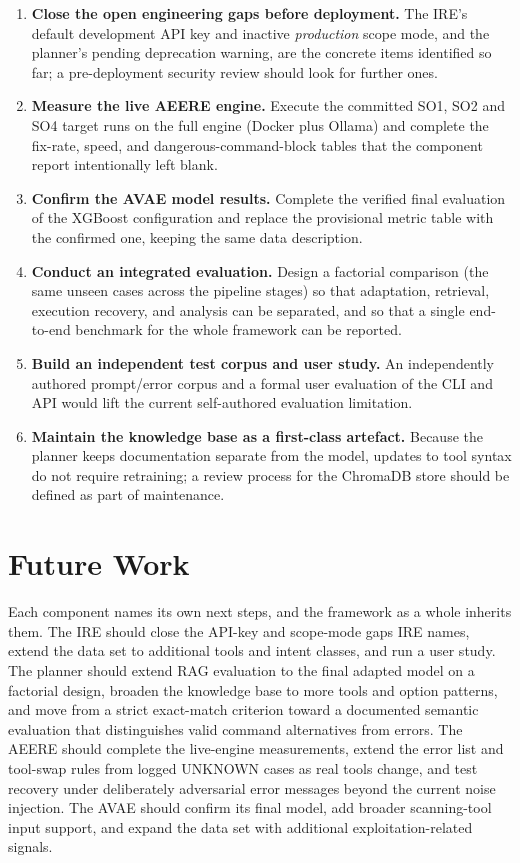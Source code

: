\begin{enumerate}
  \item \textbf{Close the open engineering gaps before deployment.} The IRE's
  default development API key and inactive \emph{production} scope mode, and the
  planner's pending deprecation warning, are the concrete items identified so
  far; a pre-deployment security review should look for further ones.
  \item \textbf{Measure the live AEERE engine.} Execute the committed SO1, SO2
  and SO4 target runs on the full engine (Docker plus Ollama) and complete the
  fix-rate, speed, and dangerous-command-block tables that the component report
  intentionally left blank.
  \item \textbf{Confirm the AVAE model results.} Complete the verified final
  evaluation of the XGBoost configuration and replace the provisional metric
  table with the confirmed one, keeping the same data description.
  \item \textbf{Conduct an integrated evaluation.} Design a factorial comparison
  (the same unseen cases across the pipeline stages) so that adaptation,
  retrieval, execution recovery, and analysis can be separated, and so that a
  single end-to-end benchmark for the whole framework can be reported.
  \item \textbf{Build an independent test corpus and user study.} An
  independently authored prompt/error corpus and a formal user evaluation of the
  CLI and API would lift the current self-authored evaluation limitation.
  \item \textbf{Maintain the knowledge base as a first-class artefact.} Because
  the planner keeps documentation separate from the model, updates to tool
  syntax do not require retraining; a review process for the ChromaDB store
  should be defined as part of maintenance.
\end{enumerate}

\section{Future Work}\label{sec:conclusions-future}

Each component names its own next steps, and the framework as a whole inherits
them. The IRE should close the API-key and scope-mode gaps IRE names, extend
the data set to additional tools and intent classes, and run a user study. The
planner should extend RAG evaluation to the final adapted model on a factorial
design, broaden the knowledge base to more tools and option patterns, and move
from a strict exact-match criterion toward a documented semantic evaluation that
distinguishes valid command alternatives from errors. The AEERE should complete
the live-engine measurements, extend the error list and tool-swap rules from
logged UNKNOWN cases as real tools change, and test recovery under deliberately
adversarial error messages beyond the current noise injection. The AVAE should
confirm its final model, add broader scanning-tool input support, and expand the
data set with additional exploitation-related signals.

